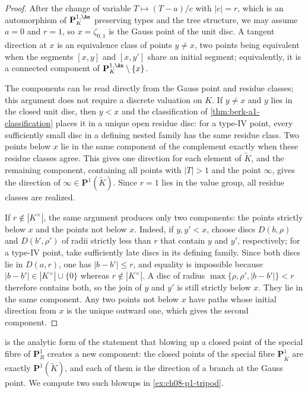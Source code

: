 \begin{proof}
After the change of variable $T\mapsto(T-a)/c$ with $|c|=r$, which is an
automorphism of $\mathbf P^{1,\An}_K$ preserving types and the tree
structure, we may assume $a=0$ and $r=1$, so $x=\zeta_{0,1}$ is the Gauss
point of the unit disc.  A tangent direction at $x$ is an equivalence class
of points $y\neq x$, two points being equivalent when the segments $[x,y]$
and $[x,y']$ share an initial segment; equivalently, it is a connected
component of $\mathbf P^{1,\An}_K\setminus\{x\}$.

The components can be read directly from the Gauss point and residue
classes; this argument does not require a discrete valuation on $K$.  If
$y\neq x$ and $y$ lies in the closed unit disc, then $y<x$ and the
classification of \cref{thm:berk-a1-classification} places it in a unique
open residue disc: for a type-$\mathrm{IV}$ point, every sufficiently small
disc in a defining nested family has the same residue class.  Two points
below $x$ lie in the same component of the complement exactly when these
residue classes agree.  This gives one direction for each element of
$\widetilde K$, and the remaining component, containing all points with
$|T|>1$ and the point $\infty$, gives the direction of
$\infty\in\mathbf P^1(\widetilde K)$.  Since $r=1$ lies in the value group,
all residue classes are realized.

If $r\notin|K^\times|$, the same argument produces only two components: the
points strictly below $x$ and the points not below $x$.  Indeed, if
$y,y'<x$, choose discs $D(b,\rho)$ and $D(b',\rho')$ of radii strictly less
than $r$ that contain $y$ and $y'$, respectively; for a type-$\mathrm{IV}$
point, take sufficiently late discs in its defining family.  Since both
discs lie in $D(a,r)$, one has $|b-b'|\leq r$, and equality is impossible
because $|b-b'|\in|K^\times|\cup\{0\}$ whereas
$r\notin|K^\times|$.  A disc of radius
$\max\{\rho,\rho',|b-b'|\}<r$ therefore contains both, so the join of $y$ and
$y'$ is still strictly below $x$.  They lie in the same component.  Any two
points not below $x$ have paths whose initial direction from $x$ is the
unique outward one, which gives the second component.
\end{proof}

\begin{remark}
\label{rem:ch08-branch-directions}
 is the analytic form of the statement that
blowing up a closed point of the special fibre of $\mathbf P^1_R$ creates a
new component: the closed points of the special fibre
$\mathbf P^1_{\widetilde K}$ are exactly $\mathbf P^1(\widetilde K)$, and each
of them is the direction of a branch at the Gauss point.  We compute two such
blowups in \cref{ex:ch08-p1-tripod}.
\end{remark}

